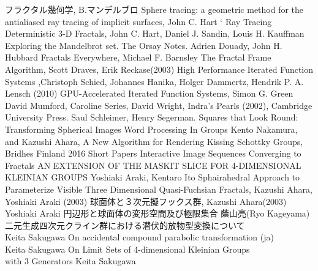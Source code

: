{
\setlength{\baselineskip}{13pt}
\begin{thebibliography}{99}
        フラクタル幾何学, 
        B.マンデルブロ 
        Sphere tracing: a geometric method for the antialiased ray tracing of implicit surfaces, John C. Hart
`
         Ray Tracing Deterministic 3-D Fractals,
         John C. Hart, Daniel J. Sandin, Louis H. Kauffman
         Exploring the Mandelbrot set. The Orsay Notes.
         Adrien Douady, John H. Hubbard
         Fractals Everywhere, Michael F. Barnsley
        The Fractal Frame Algorithm, Scott Draves, Erik Reckase(2003)
         High Performance Iterated Function Systems
         ,Christoph Schied, Johannes Hanika, Holger Dammertz, Hendrik P. A. Lensch (2010)
         GPU-Accelerated Iterated Function Systems,
         Simon G. Green
         David Mumford, Caroline Series, David Wright, Indra's Pearls
         (2002), Cambridge University Press.
         Saul Schleimer, Henry Segerman.
         Squares that Look Round: Transforming Spherical Images
         Word Processing In Groups
         Kento Nakamura, and Kazushi Ahara, A New Algorithm for
         Rendering Kissing Schottky Groups,
         Bridhes Finland 2016 Short Papers
        Interactive Image Sequences Converging to Fractals
        AN EXTENSION OF THE MASKIT SLICE FOR 4-DIMENSIONAL KLEINIAN GROUPS
        Yoshiaki Araki, Kentaro Ito
        Sphairahedral Approach to Parameterize Visible Three Dimensional Quasi-Fuchsian Fractals,
        Kazushi Ahara, Yoshiaki Araki (2003)
        球面体と３次元擬フックス群,
        Kazushi Ahara(2003)
        Yoshiaki Araki
        円辺形と球面体の変形空間及び極限集合
        蔭山亮(Ryo Kageyama)
        二元生成四次元クライン群における潜伏的放物型変換について\\
        Keita Sakugawa
        On accidental compound parabolic transformation (ja)\\
        Keita Sakugawa
        On Limit Sets of 4-dimensional Kleinian Groups\\
with 3 Generators
        Keita Sakugawa

\end{thebibliography}}
